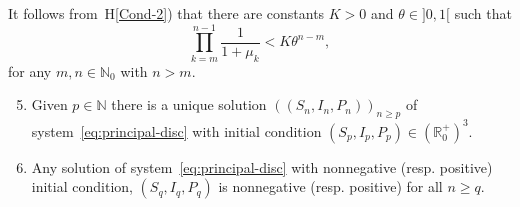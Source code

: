 \documentclass[reqno]{amsart}
\renewcommand{\ge}{\geqslant}
\newcommand{\N}{\ensuremath{\mathds N}}
\newcommand{\R}{\ensuremath{\mathds R}}
\begin{document}
It follows from~H\ref{Cond-2}) that there are constants $K>0$ and $\theta \in ]0,1[$ such that
\begin{equation}\label{eq:bahavior-prod-Lambda:(1+d)}
\prod_{k=m}^{n-1} \dfrac{1}{1+\mu_k} < K \theta^{n-m},
\end{equation}
for any $m,n \in \N_0$ with $n>m$.
{
\begin{enumerate}[H$1$)]
\setcounter{enumi}{4}
\item \label{Cond-aditional} Given $p \in \N$ there is a unique solution $((S_n,I_n,P_n))_{n \ge p}$ of
    system~\eqref{eq:principal-disc} with initial condition $(S_p,I_p,P_p) \in (\R_0^+)^3$.
\item \label{Cond-aditional2} Any solution of system~\eqref{eq:principal-disc} with nonnegative (resp. positive) initial condition, $(S_q,I_q,P_q)$  is nonnegative (resp. positive) for all $n \ge q$.
\end{enumerate}
}
\end{document}
